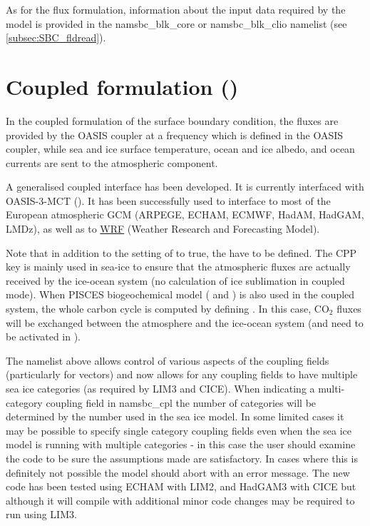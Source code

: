 \documentclass[../tex_main/NEMO_manual]{subfiles}
\begin{document}
As for the flux formulation, information about the input data required by the model is provided in
the namsbc\_blk\_core or namsbc\_blk\_clio namelist (see \autoref{subsec:SBC_fldread}). 

\section{Coupled formulation (\protect{})}
\label{sec:SBC_cpl}


In the coupled formulation of the surface boundary condition,
the fluxes are provided by the OASIS coupler at a frequency which is defined in the OASIS coupler,
while sea and ice surface temperature, ocean and ice albedo, and ocean currents are sent to
the atmospheric component.

A generalised coupled interface has been developed.
It is currently interfaced with OASIS-3-MCT ().
It has been successfully used to interface \NEMO to most of the European atmospheric GCM
(ARPEGE, ECHAM, ECMWF, HadAM, HadGAM, LMDz), as well as to \href{http://wrf-model.org/}{WRF}
(Weather Research and Forecasting Model).

Note that in addition to the setting of  to true, the  have to be defined.
The CPP key is mainly used in sea-ice to ensure that the atmospheric fluxes are actually received by
the ice-ocean system (no calculation of ice sublimation in coupled mode).
When PISCES biogeochemical model ( and ) is also used in the coupled system, 
the whole carbon cycle is computed by defining .
In this case, CO$_2$ fluxes will be exchanged between the atmosphere and the ice-ocean system
(and need to be activated in  ).

The namelist above allows control of various aspects of the coupling fields (particularly for vectors) and
now allows for any coupling fields to have multiple sea ice categories (as required by LIM3 and CICE).
When indicating a multi-category coupling field in namsbc{\_}cpl the number of categories will be determined by
the number used in the sea ice model.
In some limited cases it may be possible to specify single category coupling fields even when
the sea ice model is running with multiple categories -
in this case the user should examine the code to be sure the assumptions made are satisfactory.
In cases where this is definitely not possible the model should abort with an error message.
The new code has been tested using ECHAM with LIM2, and HadGAM3 with CICE but
although it will compile with  additional minor code changes may be required to run using LIM3.
\end{document}
